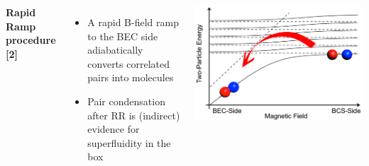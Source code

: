 \documentclass[26pt, paperwidth=36in,paperheight=48in]{tikzposter} %
\newcommand{\myfont}{\fontsize{26}{40}\selectfont}
\begin{document}

\begin{columns} 
	
	
	
	
	\block[roundedcorners=0]{\textcolor{BEC1blue}{Clogston-Chandrasekhar limit measurement}}
	{
		\begin{minipage}{0.20\textwidth}
			\flushleft
			\vspace{0.5cm}
			\textbf{Rapid Ramp procedure [2]}
			\vspace{0.5cm}
			\myfont
			\begin{itemize}
				\item A rapid B-field ramp to the BEC side adiabatically converts correlated pairs into molecules 
				\item Pair condensation after RR is (indirect) evidence for superfluidity in the box
											
			\end{itemize}
		\end{minipage}
		\hspace{2.0cm}
		\begin{minipage}{0.17\textwidth}
			\vspace{0.5cm}
			\hspace{1.0cm}
			\includegraphics[width=1.1\textwidth]{figures_retreat/rapid_ramp.png}
		\end{minipage}
		\vspace{1.0cm}
		
}
\end{columns}
\end{document}
